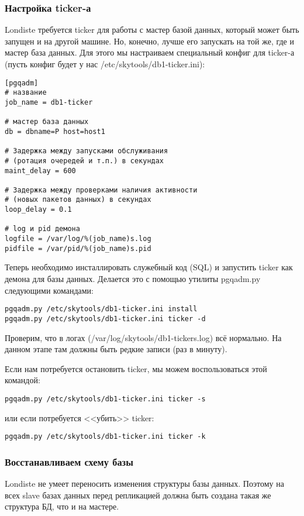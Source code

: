 \subsubsection{Настройка ticker-а}
Londiste требуется ticker для работы с мастер базой данных, который может быть запущен и на другой машине.
Но, конечно, лучше его запускать на той же, где и мастер база данных. Для этого мы настраиваем специальный
конфиг для ticker-а (пусть конфиг будет у нас /etc/skytools/db1-ticker.ini):
\begin{lstlisting}[label=lst:londiste5,caption=Настройка ticker-а]
[pgqadm]
# название
job_name = db1-ticker

# мастер база данных
db = dbname=P host=host1

# Задержка между запусками обслуживания
# (ротация очередей и т.п.) в секундах
maint_delay = 600

# Задержка между проверками наличия активности
# (новых пакетов данных) в секундах
loop_delay = 0.1

# log и pid демона
logfile = /var/log/%(job_name)s.log
pidfile = /var/pid/%(job_name)s.pid
\end{lstlisting}

Теперь необходимо инсталлировать служебный код (SQL) и запустить ticker как демона для базы данных.
Делается это с помощью утилиты pgqadm.py следующими командами:
\begin{lstlisting}[label=lst:londiste6,caption=Настройка ticker-а]
pgqadm.py /etc/skytools/db1-ticker.ini install
pgqadm.py /etc/skytools/db1-ticker.ini ticker -d
\end{lstlisting}

Проверим, что в логах (/var/log/skytools/db1-tickers.log) всё нормально. На данном этапе там должны быть редкие записи (раз в минуту).

Если нам потребуется остановить ticker, мы можем воспользоваться этой командой:
\begin{lstlisting}[label=lst:londiste7,caption=Настройка ticker-а]
pgqadm.py /etc/skytools/db1-ticker.ini ticker -s
\end{lstlisting}
или если потребуется <<убить>> ticker:
\begin{lstlisting}[label=lst:londiste8,caption=Настройка ticker-а]
pgqadm.py /etc/skytools/db1-ticker.ini ticker -k
\end{lstlisting}

\subsubsection{Восстанавливаем схему базы}
Londiste не умеет переносить изменения структуры базы данных.
Поэтому на всех slave базах данных перед репликацией должна быть создана такая же структура БД, что и на мастере.

